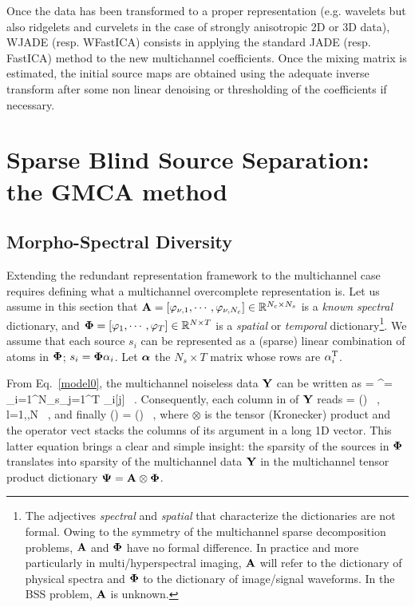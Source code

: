 Once the data has been transformed to a proper representation (e.g. wavelets but also ridgelets and curvelets in the case of strongly 
anisotropic 2D or 3D data), WJADE (resp. WFastICA) consists in applying the standard JADE (resp. FastICA) method to the new multichannel coefficients. Once the mixing matrix 
is estimated, the initial source maps are obtained using the adequate inverse transform after some non linear denoising or thresholding of 
the coefficients if necessary.


\section{Sparse Blind Source Separation: the GMCA method}
\label{sec:gmca}

\subsection{Morpho-Spectral Diversity}
Extending the redundant representation framework to the multichannel case requires defining what a multichannel overcomplete representation is.
Let us assume in this section that ${\mathbf{A}} = [\varphi_{\nu,1}, \cdots, \varphi_{\nu, N_c}] \in {\mathbb{R}}^{N_c \times N_s}$ is a \textit{known spectral} dictionary, 
and ${\bf\Phi} = [ \varphi_{1}, \cdots, \varphi_{T}] \in {\mathbb{R}}^{N \times T}$ is a \textit{spatial} or \textit{temporal} dictionary\footnote{The adjectives 
\textit{spectral} and \textit{spatial} that characterize the dictionaries are not formal. Owing to the symmetry of the multichannel sparse decomposition problems, 
${\mathbf{A}}$ and ${\bf\Phi}$ have no formal difference. In practice and more particularly in multi/hyperspectral imaging, ${\mathbf{A}}$ will refer to the dictionary of physical spectra 
and ${\bf\Phi}$ to the dictionary of image/signal waveforms. In the BSS problem, ${\mathbf{A}}$ is unknown.}. We assume that each source $s_i$ can be represented as 
a (sparse) linear combination of atoms in ${\bf\Phi}$; $s_i={\bf\Phi}\alpha_i$. Let ${\boldsymbol \alpha}$ the $N_s \times T$ matrix whose rows are $\alpha_i^{\mathrm{T}}$.

From Eq.~\eqref{model0}, the multichannel noiseless data $\mathbf{Y}$ can be written as
\be
\label{eq:tensor1}
\bY = \A\balpha\W^\Tr = \sum_{i=1}^{N_s}\sum_{j=1}^{T} \alpha_i[j] ~.
\ee
Consequently, each column in of $\mathbf{Y}$ reads
\be
\label{eq:tensor2}
\bY[.,l] = \parenth{\A \otimes \W[l,.]} (\balpha) ~, \quad \forall ~ l=1,\cdots,N ~,
\ee
and finally
\be
\label{eq:tensor3}
(\bY) = \parenth{\A \otimes \W} (\balpha) ~,
\ee
where $\otimes$ is the tensor (Kronecker) product and the operator $\mathrm{vect}$ stacks the columns of its argument in a long 1D vector. 
This latter equation brings a clear and simple insight: the sparsity of the sources in ${\bf\Phi}$ translates into sparsity of the multichannel data 
$\mathbf{Y}$ in the multichannel tensor product dictionary ${\bf \Psi}={\mathbf{A}} \otimes {\bf\Phi}$. 

